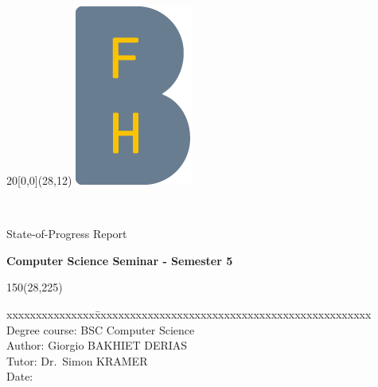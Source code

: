 \begin{titlepage}


\setlength{\unitlength}{1mm}
\begin{textblock}{20}[0,0](28,12)
	\includegraphics[scale=1.0]{images/BFH_Logo_B.png}
\end{textblock}

\begin{flushleft}

\vspace*{21mm}

\fontsize{26pt}{40pt}\selectfont 
\heading				\\							%
\vspace{2mm}

\fontsize{16pt}{24pt}\selectfont\vspace{0.3em}
State-of-Progress Report 			\\				%
\vspace{5mm}

\fontsize{12pt}{12pt}\selectfont
\textbf{Computer Science Seminar - Semester 5} \\		%
\vspace{7mm}


\begin{textblock}{150}(28,225)
\fontsize{12pt}{17pt}\selectfont
\begin{tabbing}
xxxxxxxxxxxxxxx\=xxxxxxxxxxxxxxxxxxxxxxxxxxxxxxxxxxxxxxxxxxxxxxx \kill
Degree course:	\> BSC Computer Science	\\		%
Author:		\> Giorgio BAKHIET DERIAS 		\\	%
Tutor:	\> Dr.~Simon KRAMER		\\							%
Date:			\> \versiondate					\\							%
\end{tabbing}


\end{textblock}
\end{flushleft}
\end{titlepage}
